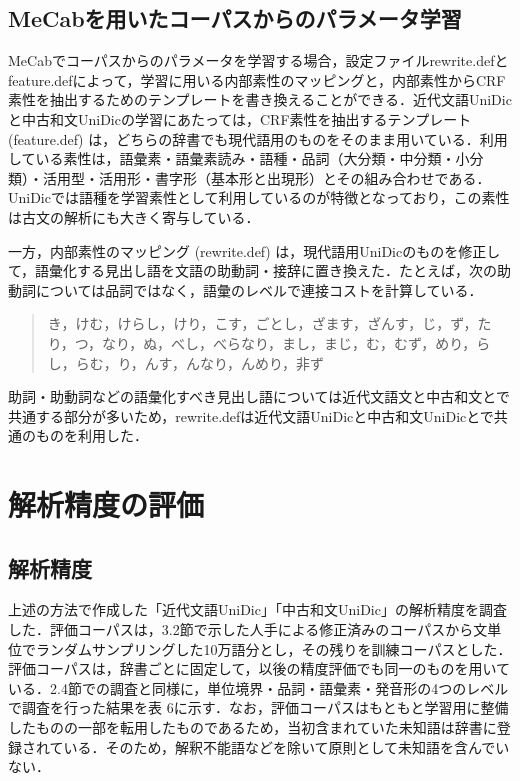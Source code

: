 \documentclass[japanese]{jnlp_1.4}
\begin{document}
\subsection{MeCabを用いたコーパスからのパラメータ学習}

MeCabでコーパスからのパラメータを学習する場合，設定ファイルrewrite.defとfeature.defによって，学習に用いる内部素性のマッピングと，内部素性からCRF素性を抽出するためのテンプレートを書き換えることができる．近代文語UniDicと中古和文UniDicの学習にあたっては，CRF素性を抽出するテンプレート (feature.def) は，どちらの辞書でも現代語用のものをそのまま用いている．利用している素性は，語彙素・語彙素読み・語種・品詞（大分類・中分類・小分類）・活用型・活用形・書字形（基本形と出現形）とその組み合わせである．UniDicでは語種を学習素性として利用しているのが特徴となっており\cite{Den2008}，この素性は古文の解析にも大きく寄与している．

一方，内部素性のマッピング (rewrite.def) は，現代語用UniDicのものを修正して，語彙化する見出し語を文語の助動詞・接辞に置き換えた．たとえば，次の助動詞については品詞ではなく，語彙のレベルで連接コストを計算している．

\begin{quote}
き，けむ，けらし，けり，こす，ごとし，ざます，ざんす，じ，ず，たり，つ，なり，ぬ，べし，べらなり，まし，まじ，む，むず，めり，らし，らむ，り，んす，んなり，んめり，非ず
\end{quote}

助詞・助動詞などの語彙化すべき見出し語については近代文語文と中古和文とで共通する部分が多いため，rewrite.defは近代文語UniDicと中古和文UniDicとで共通のものを利用した．


\section{解析精度の評価}

\subsection{解析精度}

上述の方法で作成した「近代文語UniDic」「中古和文UniDic」の解析精度を調査した．評価コーパスは，3.2節で示した人手による修正済みのコーパスから文単位でランダムサンプリングした10万語分とし，その残りを訓練コーパスとした．評価コーパスは，辞書ごとに固定して，以後の精度評価でも同一のものを用いている．2.4節での調査と同様に，単位境界・品詞・語彙素・発音形の4つのレベルで調査を行った結果を表 6に示す．なお，評価コーパスはもともと学習用に整備したものの一部を転用したものであるため，当初含まれていた未知語は辞書に登録されている．そのため，解釈不能語などを除いて原則として未知語を含んでいない．
\end{document}
